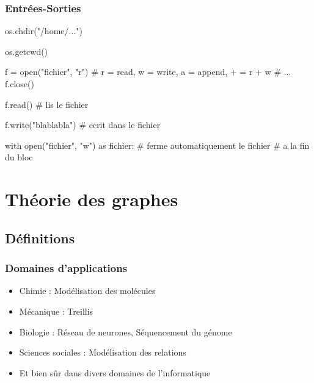 \documentclass{beamer}
\let\oldsubsubsection\subsubsection
\renewcommand{\subsubsection}[2][]{\def\currentsubsubsection{#2}\oldsubsubsection[#1]{#2}}
\begin{document}
\subsubsection{Entrées-Sorties}
\begin{code}{\codeboxa}
os.chdir("/home/...")
  
os.getcwd()
  
f = open("fichier", "r") 
# r = read, w = write, a = append, + = r + w
# ...
f.close()
\end{code}
\begin{code}{\codeboxb}
f.read() # lis le fichier
  
f.write("blablabla") # ecrit dans le fichier
  
with open("fichier", "w") as fichier:
    # ferme automatiquement le fichier
    # a la fin du bloc
\end{code}
\begin{frame}
  \begin{overprint}
    \usebox\codeboxa
    \usebox\codeboxb
  \end{overprint}
\end{frame}

\section{Théorie des graphes}
\subsection{Définitions}
\subsubsection{Domaines d'applications}
\begin{frame}
    \begin{itemize}
        \item Chimie : Modélisation des molécules
        
        \item Mécanique : Treillis
        
        \item Biologie : Réseau de neurones, Séquencement du génome
        
        \item Sciences sociales : Modélisation des relations

        \item Et bien sûr dans divers domaines de l'informatique
    \end{itemize}
\end{frame}
\end{document}

